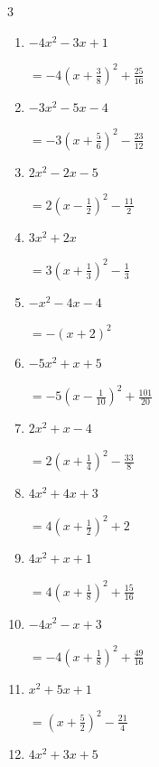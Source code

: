 \begin{multicols}{3}
\begin{enumerate}
\columnbreak %

  \item $-4x^{2}-3x+1$

        $\displaystyle =-4\left( x+\frac{3}{8}\right)^{2}+\frac{25}{16}$

  \item $-3x^{2}-5x-4$

        $\displaystyle =-3\left( x+\frac{5}{6}\right)^{2}-\frac{23}{12}$

  \item $2x^{2}-2x-5$

        $\displaystyle =2\left( x-\frac{1}{2}\right)^{2}-\frac{11}{2}$

  \item $3x^{2}+2x$

        $\displaystyle =3\left( x+\frac{1}{3}\right)^{2}-\frac{1}{3}$

  \item $-x^{2}-4x-4$

        $\displaystyle =-\left( x+2\right)^{2}$

\columnbreak %

\resetques

  \item $-5x^{2}+x+5$

        $\displaystyle =-5\left( x-\frac{1}{10}\right)^{2}+\frac{101}{20}$

  \item $2x^{2}+x-4$

        $\displaystyle =2\left( x+\frac{1}{4}\right)^{2}-\frac{33}{8}$

  \item $4x^{2}+4x+3$

        $\displaystyle =4\left( x+\frac{1}{2}\right)^{2}+2$

  \item $4x^{2}+x+1$

        $\displaystyle =4\left( x+\frac{1}{8}\right)^{2}+\frac{15}{16}$

  \item $-4x^{2}-x+3$

        $\displaystyle =-4\left( x+\frac{1}{8}\right)^{2}+\frac{49}{16}$

\columnbreak %

  \item $x^{2}+5x+1$

        $\displaystyle =\left( x+\frac{5}{2}\right)^{2}-\frac{21}{4}$

  \item $4x^{2}+3x+5$


\end{enumerate}
\end{multicols}
